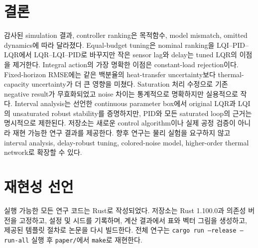 \section{결론}
감사된 simulation 결과, controller ranking은 목적함수, model mismatch, omitted dynamics에 따라 달라졌다. Equal-budget tuning은 nominal ranking을 LQI--PID--LQR에서 LQR--LQI--PID로 바꾸지만 작은 sensor lag와 delay는 tuned LQR의 이점을 제거한다. Integral action의 가장 명확한 이점은 constant-load rejection이다. Fixed-horizon RMSE에는 같은 백분율의 heat-transfer uncertainty보다 thermal-capacity uncertainty가 더 큰 영향을 미쳤다. Saturation 처리 수정으로 기존 negative result가 무효화되었고 noise 차이는 통계적으로 명확하지만 실용적으로 작다. Interval analysis는 선언한 continuous parameter box에서 original LQR과 LQI의 unsaturated robust stability를 증명하지만, PID와 모든 saturated loop의 근거는 명시적으로 제한된다. 저장소는 새로운 control algorithm이나 실제 공정 검증이 아니라 재현 가능한 연구 결과를 제공한다. 향후 연구는 물리 실험을 요구하지 않고 interval analysis, delay-robust tuning, colored-noise model, higher-order thermal network로 확장할 수 있다.

\section*{재현성 선언}
실행 가능한 모든 연구 코드는 Rust로 작성되었다. 저장소는 Rust 1.100.0과 의존성 버전을 고정하고, 설정 및 시드를 기록하며, 계산 결과에서 표와 벡터 그림을 생성하고, 제공된 템플릿 절차로 논문을 다시 빌드한다. 전체 연구는 \texttt{cargo run --release -- run-all} 실행 후 \texttt{paper/}에서 \texttt{make}로 재현한다.
